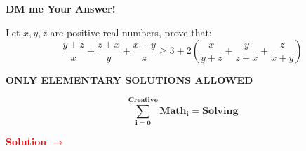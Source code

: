 \documentclass[12pt]{article}
\begin{document}
	










	\begin{center}
		\thispagestyle{empty}

\vspace*{2cm}

		{\huge\textbf{DM me Your Answer!}}
		\vspace*{1cm}
	\end{center}
		
		{\Huge Let $x, y, z$ are positive real numbers, prove that:
$$\frac{y+z}{x} + \frac{z+x}{y} + \frac{x+y}{z} \geq 3+2\left(\frac{x}{y+z}+\frac{y}{z+x}+\frac{z}{x+y}\right)
$$}
		
		\vspace{1cm}
	\begin{center}	
		{\LARGE\textbf{ONLY ELEMENTARY SOLUTIONS ALLOWED}}
		
		\vspace{1cm}

{\fontsize{40}{30}\selectfont 
		
		$$\boldsymbol{\sum \limits_{i=0}^{Creative} Math_i = Solving}$$}
		
		\vspace{1cm}
		
		\begin{mybox}\Huge{\begin{center}\textbf{\textcolor{red}{Solution $\to$}} \end{center}}\end{mybox}
	\end{center}
\end{document}
